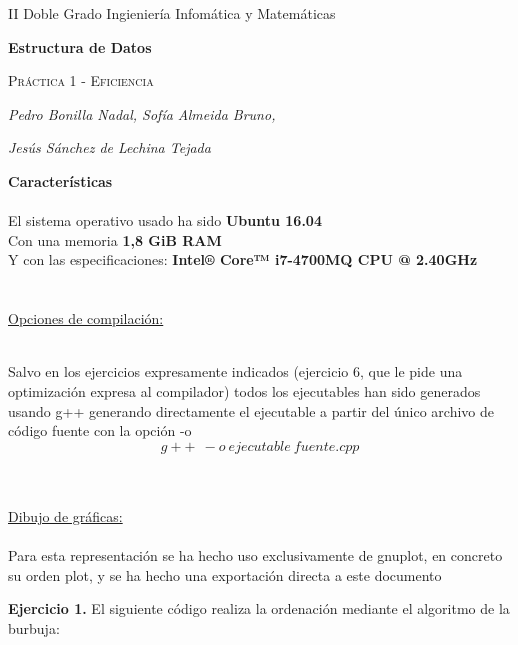 \documentclass[titlepage, 12pt,a4paper]{article}
\author{Pedro Bonilla Nadal, Sofía Almeida Bruno, Jesús Sáchez de Lechina Tejada}
\date{\small{}}
\begin{document}
\begin{titlepage}
	\vspace{1cm}
	\centering
	{\small II Doble Grado Ingieniería Infomática y Matemáticas  \par}
	\vspace{3.5cm}
	{\huge\bfseries  Estructura de Datos\par}
	\vspace{2.5cm}
	{\scshape\Large Práctica 1 - Eficiencia\par}
	\vspace{2cm}
	{\Large\itshape Pedro Bonilla Nadal, Sofía Almeida Bruno,  \par}
	{\Large\itshape Jesús Sánchez de Lechina Tejada \par}
	\vfill

	\vfill

	{\large \par}
\end{titlepage}


\textbf{\large Características}
\ \\\\ 
  El sistema operativo usado ha sido \textbf{Ubuntu 16.04}\\
  Con una memoria
  \textbf{1,8 GiB RAM}\\
  Y con las especificaciones:
  \textbf{Intel® Core™ i7-4700MQ CPU @ 2.40GHz}\\\\\\
  \underline{Opciones de compilación:}

\ \\ 	
Salvo en los ejercicios expresamente indicados (ejercicio 6, que le pide una optimización expresa al compilador) todos los ejecutables han sido generados usando g++ generando directamente el ejecutable a partir del único archivo de código fuente con la opción -o
\\
$$g++\ \ -o\ ejecutable\ fuente.cpp $$

\ \\\\
\underline{Dibujo de gráficas:}
\\\\
Para esta representación se ha hecho uso exclusivamente de gnuplot, en concreto su orden plot, y se ha hecho una exportación directa a este documento
\newpage


	\textbf{\large Ejercicio 1.} El siguiente código realiza la ordenación mediante el algoritmo de la burbuja:\vspace {1em}
	
\end{document}

